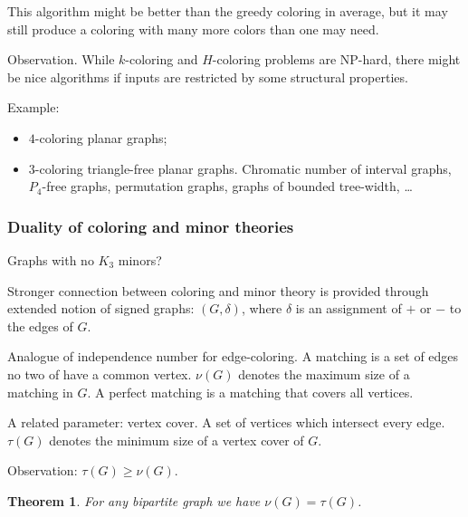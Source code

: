 \documentclass[12pt,a4paper]{article} \usepackage{fontspec}
\newtheorem{theorem}{Theorem} \newtheorem{definition}{Definition}
\begin{document}
This algorithm might be better than the greedy coloring in average, but it may
still produce a coloring with many more colors than one may need.

Observation.  While \(k\)-coloring and \(H\)-coloring problems are NP-hard,
there might be nice algorithms if inputs are restricted by some structural
properties.

Example: \begin{itemize} \item \(4\)-coloring planar graphs; \item
\(3\)-coloring triangle-free planar graphs.  Chromatic number of interval
graphs, \(P_4\)-free graphs, permutation graphs, graphs of bounded tree-width, …
\end{itemize}

\subsubsection{Duality of coloring and minor theories} Graphs with no \(K_3\)
minors?

Stronger connection between coloring and minor theory is provided through
extended notion of signed graphs: \((G, \delta)\), where \(\delta\) is an
assignment of \(+\) or \(-\) to the edges of \(G\).

Analogue of independence number for edge-coloring.  A matching is a set of edges
no two of have a common vertex.  \(\nu(G)\) denotes the maximum size of a
matching in \(G\).  A perfect matching is a matching that covers all vertices.

A related parameter: vertex cover.  A set of vertices which intersect every
edge.  \(\tau(G)\) denotes the minimum size of a vertex cover of \(G\).

Observation: \(\tau(G) \geq \nu(G)\).

\begin{theorem} For any bipartite graph we have \(\nu(G) = \tau(G)\).
\end{theorem}
\end{document}
